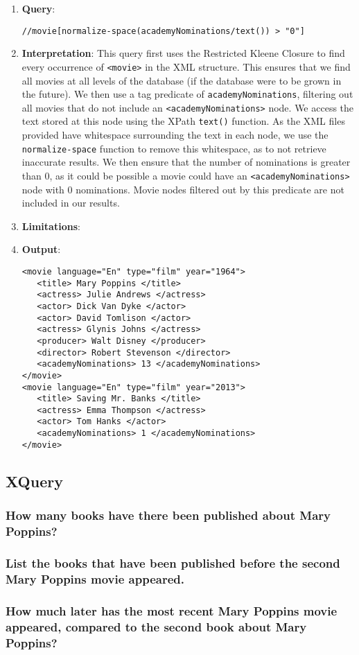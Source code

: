 \documentclass[11pt]{article}
\begin{document}
\begin{enumerate}
\item \textbf{Query}:
\begin{small}
\begin{verbatim}
//movie[normalize-space(academyNominations/text()) > "0"]
\end{verbatim}
\end{small}
\item \textbf{Interpretation}: This query first uses the Restricted Kleene Closure to find every occurrence of \texttt{<movie>} in the XML structure. This ensures that we find all movies at all levels of the database (if the database were to be grown in the future). We then use a tag predicate of \texttt{academyNominations}, filtering out all movies that do not include an \texttt{<academyNominations>} node. We access the text stored at this node using the XPath \texttt{text()} function. As the XML files provided have whitespace surrounding the text in each node, we use the \texttt{normalize-space} function to remove this whitespace, as to not retrieve inaccurate results. We then ensure that the number of nominations is greater than 0, as it could be possible a movie could have an \texttt{<academyNominations>} node with 0 nominations. Movie nodes filtered out by this predicate are not included in our results.
\item \textbf{Limitations}: 
\item \textbf{Output}:
\begin{verbatim}
<movie language="En" type="film" year="1964">
   <title> Mary Poppins </title>
   <actress> Julie Andrews </actress>
   <actor> Dick Van Dyke </actor>
   <actor> David Tomlison </actor>
   <actress> Glynis Johns </actress>
   <producer> Walt Disney </producer>
   <director> Robert Stevenson </director>
   <academyNominations> 13 </academyNominations>
</movie>
<movie language="En" type="film" year="2013">
   <title> Saving Mr. Banks </title>
   <actress> Emma Thompson </actress>
   <actor> Tom Hanks </actor>
   <academyNominations> 1 </academyNominations>
</movie>
\end{verbatim} 
\end{enumerate}


\subsection{XQuery}

\subsubsection{How many books have there been published about Mary Poppins?}

\subsubsection{List the books that have been published before the second Mary Poppins movie appeared.}

\subsubsection{How much later has the most recent Mary Poppins movie appeared, compared to the second book about Mary Poppins?}
\end{document}
